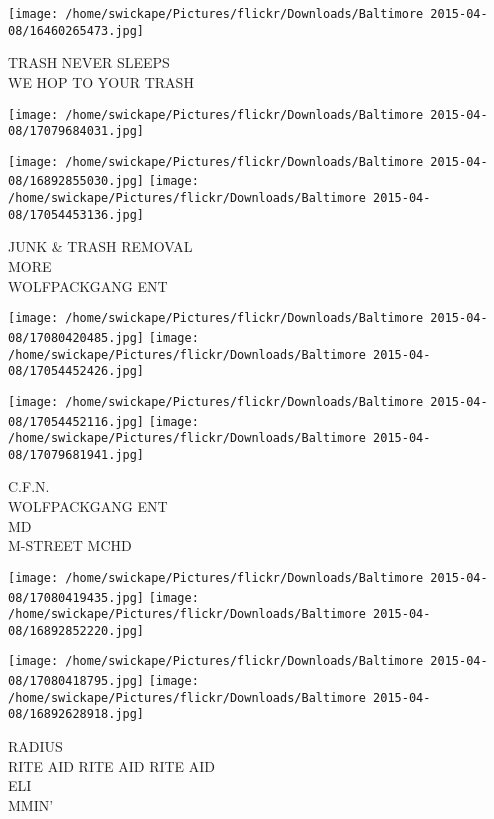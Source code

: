 \documentclass[10pt,letterpaper]{article}
\begin{document}
\vspace{0.25in}
\texttt{[image: /home/swickape/Pictures/flickr/Downloads/Baltimore 2015-04-08/16460265473.jpg]}

TRASH NEVER SLEEPS\\
WE HOP TO YOUR TRASH\\
\pagebreak

\texttt{[image: /home/swickape/Pictures/flickr/Downloads/Baltimore 2015-04-08/17079684031.jpg]}

\vspace{0.25in}
\texttt{[image: /home/swickape/Pictures/flickr/Downloads/Baltimore 2015-04-08/16892855030.jpg]}
\texttt{[image: /home/swickape/Pictures/flickr/Downloads/Baltimore 2015-04-08/17054453136.jpg]}

JUNK \& TRASH REMOVAL\\
MORE\\
WOLFPACKGANG ENT\\
\pagebreak

\texttt{[image: /home/swickape/Pictures/flickr/Downloads/Baltimore 2015-04-08/17080420485.jpg]}
\texttt{[image: /home/swickape/Pictures/flickr/Downloads/Baltimore 2015-04-08/17054452426.jpg]}

\texttt{[image: /home/swickape/Pictures/flickr/Downloads/Baltimore 2015-04-08/17054452116.jpg]}
\texttt{[image: /home/swickape/Pictures/flickr/Downloads/Baltimore 2015-04-08/17079681941.jpg]}

C.F.N.\\
WOLFPACKGANG ENT\\
MD\\
M{-}STREET MCHD\\
\pagebreak

\texttt{[image: /home/swickape/Pictures/flickr/Downloads/Baltimore 2015-04-08/17080419435.jpg]}
\texttt{[image: /home/swickape/Pictures/flickr/Downloads/Baltimore 2015-04-08/16892852220.jpg]}

\texttt{[image: /home/swickape/Pictures/flickr/Downloads/Baltimore 2015-04-08/17080418795.jpg]}
\texttt{[image: /home/swickape/Pictures/flickr/Downloads/Baltimore 2015-04-08/16892628918.jpg]}

RADIUS\\
RITE AID RITE AID RITE AID\\
ELI\\
MMIN'\\
\pagebreak
\end{document}
